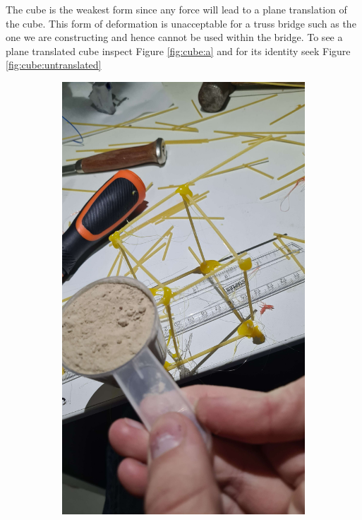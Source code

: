 \documentclass{report}
\newcommand{\subimgw}{.7\linewidth}
\begin{document}
The cube is the weakest form since any force will lead to a plane translation of the cube. This form of deformation is unacceptable for a truss bridge such as the one we are constructing and hence cannot be used within the bridge. To see a plane translated cube inspect Figure \ref{fig:cube:a} and for its identity seek Figure \ref{fig:cube:untranslated}

\begin{figure}[H]
	\begin{subfigure}{.5\textwidth}
		\centering
		\includegraphics[width=\subimgw]{cube-a}


\end{subfigure}
\end{figure}
\end{document}
